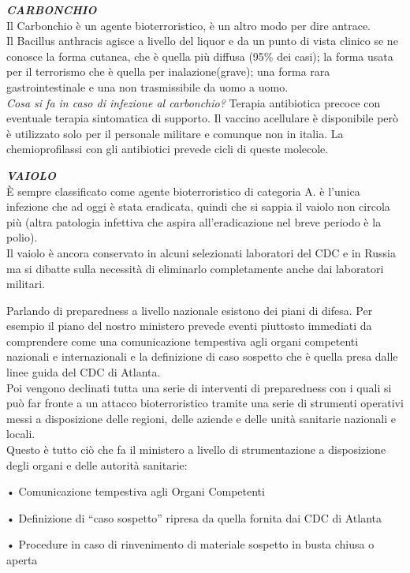 \documentclass[]{article}
\begin{document}
\textbf{\emph{CARBONCHIO}}\\
Il Carbonchio è un agente bioterroristico, è un altro modo per dire
antrace.\\
Il Bacillus anthracis agisce a livello del liquor e da un punto di vista
clinico se ne conosce la forma cutanea, che è quella più diffusa (95\%
dei casi); la forma usata per il terrorismo che è quella per
inalazione(grave); una forma rara gastrointestinale e una non
trasmissibile da uomo a uomo.\\
\emph{Cosa si fa in caso di infezione al carbonchio?} Terapia
antibiotica precoce con eventuale terapia sintomatica di supporto. Il
vaccino acellulare è disponibile però è utilizzato solo per il personale
militare e comunque non in italia. La chemioprofilassi con gli
antibiotici prevede cicli di queste molecole.

\textbf{\emph{VAIOLO\\
}}È sempre classificato come agente bioterroristico di categoria A. è
l'unica infezione che ad oggi è stata eradicata, quindi che si sappia il
vaiolo non circola più (altra patologia infettiva che aspira
all'eradicazione nel breve periodo è la polio).\\
Il vaiolo è ancora conservato in alcuni selezionati laboratori del CDC e
in Russia ma si dibatte sulla necessità di eliminarlo completamente
anche dai laboratori militari.

Parlando di preparedness a livello nazionale esistono dei piani di
difesa. Per esempio il piano del nostro ministero prevede eventi
piuttosto immediati da comprendere come una comunicazione tempestiva
agli organi competenti nazionali e internazionali e la definizione di
caso sospetto che è quella presa dalle linee guida del CDC di Atlanta.\\
Poi vengono declinati tutta una serie di interventi di preparedness con
i quali si può far fronte a un attacco bioterroristico tramite una serie
di strumenti operativi messi a disposizione delle regioni, delle aziende
e delle unità sanitarie nazionali e locali.\\
Questo è tutto ciò che fa il ministero a livello di strumentazione a
disposizione degli organi e delle autorità sanitarie:

• Comunicazione tempestiva agli Organi Competenti

• Definizione di ``caso sospetto'' ripresa da quella fornita dai CDC di
Atlanta

• Procedure in caso di rinvenimento di materiale sospetto in busta
chiusa o aperta
\end{document}
